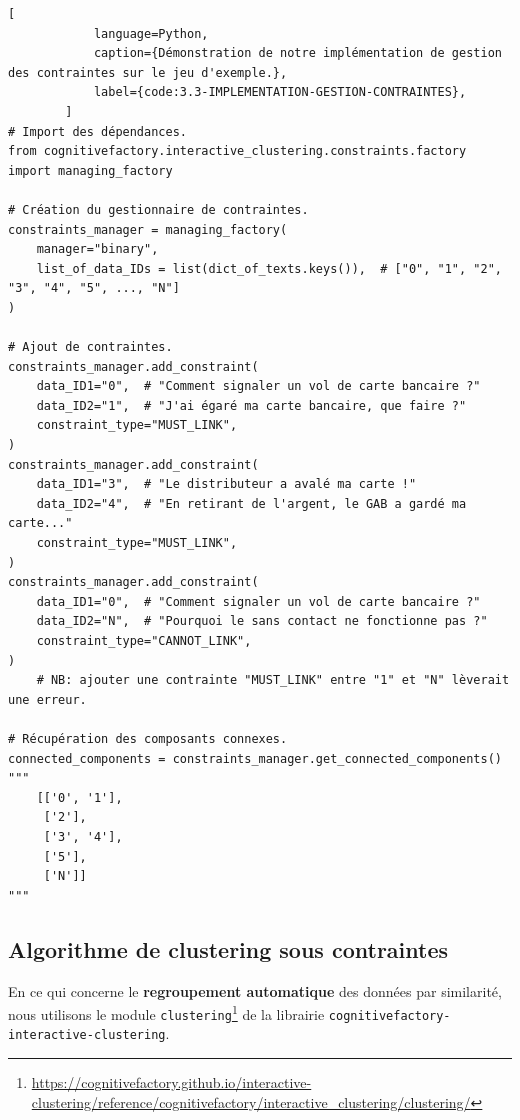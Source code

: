 		\begin{lstlisting}[
			language=Python,
			caption={Démonstration de notre implémentation de gestion des contraintes sur le jeu d'exemple.},
			label={code:3.3-IMPLEMENTATION-GESTION-CONTRAINTES},
		]
# Import des dépendances.
from cognitivefactory.interactive_clustering.constraints.factory import managing_factory

# Création du gestionnaire de contraintes.
constraints_manager = managing_factory(
    manager="binary",
    list_of_data_IDs = list(dict_of_texts.keys()),  # ["0", "1", "2", "3", "4", "5", ..., "N"]
)

# Ajout de contraintes.
constraints_manager.add_constraint(
    data_ID1="0",  # "Comment signaler un vol de carte bancaire ?"
    data_ID2="1",  # "J'ai égaré ma carte bancaire, que faire ?"
    constraint_type="MUST_LINK",
)
constraints_manager.add_constraint(
    data_ID1="3",  # "Le distributeur a avalé ma carte !"
    data_ID2="4",  # "En retirant de l'argent, le GAB a gardé ma carte..."
    constraint_type="MUST_LINK",
)
constraints_manager.add_constraint(
    data_ID1="0",  # "Comment signaler un vol de carte bancaire ?"
    data_ID2="N",  # "Pourquoi le sans contact ne fonctionne pas ?"
    constraint_type="CANNOT_LINK",
)
	# NB: ajouter une contrainte "MUST_LINK" entre "1" et "N" lèverait une erreur.

# Récupération des composants connexes.
connected_components = constraints_manager.get_connected_components()
"""
	[['0', '1'],
	 ['2'],
	 ['3', '4'],
	 ['5'],
	 ['N']]
"""
		\end{lstlisting}
		
		
		\subsection{Algorithme de clustering sous contraintes}
		\label{section:3.3.3-ALGORITHMES-CLUSTERING-SOUS-CONTRAINTES}
		
		En ce qui concerne le \textbf{regroupement automatique} des données par similarité, nous utilisons le module \texttt{clustering}\footnote{\url{https://cognitivefactory.github.io/interactive-clustering/reference/cognitivefactory/interactive_clustering/clustering/}} de la librairie \texttt{cognitivefactory-interactive-clustering}.
		

